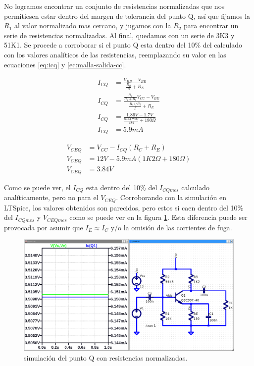  No logramos encontrar un conjunto de resistencias normalizadas que nos permitiesen estar dentro del margen de
  tolerancia del punto Q, así que fijamos la $R_1$ al valor normalizado mas cercano, y jugamos con la $R_2$ para
  encontrar un serie de resistencias normalizadas. Al final, quedamos con un serie de 3K3 y 51K1. Se procede a corroborar
  si el punto Q esta dentro del 10\% del calculado con los valores analíticos de las resistencias, reemplazando su
  valor en las ecuaciones \ref{eq:icq} y \ref{ec:malla-salida-cc}.

  \begin{figure}[!ht]
    \centering
    \begin{minipage}{0.49\textwidth}
      \begin{align*}
        I_{CQ} &= \frac{V_{BB} - V_{BE}}{\frac{R_B}{\beta} + R_E}\\[6pt]
        I_{CQ} &= \frac{\frac{R_1}{R_1 + R_2} V_{CC} - V_{BE}}{\frac{R_1//R_2}{\beta} + R_E}\\[6pt]
        I_{CQ} &= \frac{1.86V - 1.7V}{\frac{8444.79 \Omega}{484} + 180 \Omega}\\[6pt]
        I_{CQ} &= 5.9 mA
      \end{align*}
    \end{minipage}
    \begin{minipage}{0.49\textwidth}
      \begin{align*}
        V_{CEQ} &= V_{CC} - I_{CQ} \left(R_C + R_E \right)\\[6pt]
        V_{CEQ} &= 12V - 5.9mA \left(1K2 \Omega + 180 \Omega \right)\\[6pt]
        V_{CEQ} &= 3.84V
      \end{align*}
    \end{minipage}
  \end{figure}

  Como se puede ver, el $I_{CQ}$ esta dentro del 10\% del $I_{CQ mes}$ calculado analíticamente, pero no para el
  $V_{CEQ}$. Corroborando con la simulación en LTSpice, los valores obtenidos son parecidos, pero estos si caen dentro
  del 10\% del $I_{CQ mes}$ y $V_{CEQ mes}$ como se puede ver en la figura \ref{fig:pto_q_normalizado}. Esta diferencia
  puede ser provocada por asumir que $I_E \approx I_C$ y/o la omisión de las corrientes de fuga.

  \begin{figure}[!ht]
    \centering
    \includegraphics[width=.9\textwidth]{images/pto_q_normalizado.png}
    \caption{simulación del punto Q con resistencias normalizadas.}
    \label{fig:pto_q_normalizado}
  \end{figure}

